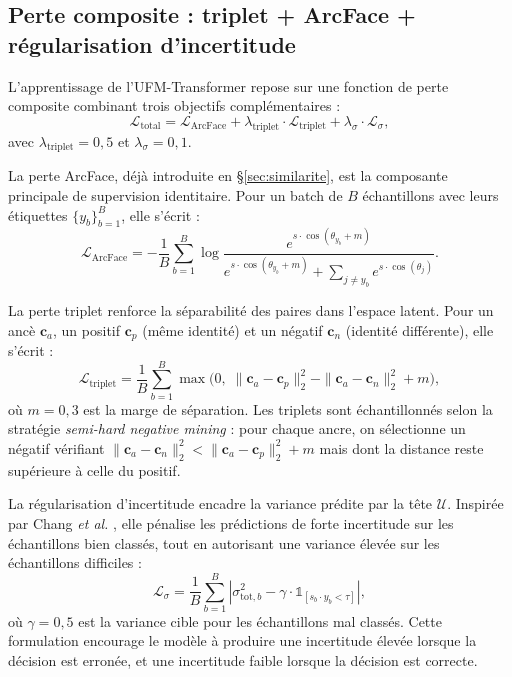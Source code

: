 \documentclass[12pt,a4paper]{report}
\newcommand{\margin}{\ensuremath{m}}
\begin{document}
\subsection{Perte composite : triplet + ArcFace + r\'{e}gularisation d'incertitude}

L'apprentissage de l'UFM-Transformer repose sur une fonction de perte composite combinant trois objectifs compl\'{e}mentaires :
\begin{equation}
\label{eq:perte-totale}
\mathcal{L}_{\text{total}} = \mathcal{L}_{\text{ArcFace}} + \lambda_{\text{triplet}} \cdot \mathcal{L}_{\text{triplet}} + \lambda_{\sigma} \cdot \mathcal{L}_{\sigma},
\end{equation}
avec $\lambda_{\text{triplet}} = 0{,}5$ et $\lambda_{\sigma} = 0{,}1$.

La perte ArcFace, d\'{e}j\`{a} introduite en \S\ref{sec:similarite}, est la composante principale de supervision identitaire. Pour un batch de $B$ \'{e}chantillons avec leurs \'{e}tiquettes $\{y_b\}_{b=1}^B$, elle s'\'{e}crit :
\begin{equation}
\mathcal{L}_{\text{ArcFace}} = -\frac{1}{B} \sum_{b=1}^B \log \frac{e^{s \cdot \cos(\theta_{y_b} + m)}}{e^{s \cdot \cos(\theta_{y_b} + m)} + \sum_{j \neq y_b} e^{s \cdot \cos(\theta_j)}}.
\end{equation}

La perte triplet renforce la s\'{e}parabilit\'{e} des paires dans l'espace latent. Pour un anc\`{e} $\mathbf{c}_a$, un positif $\mathbf{c}_p$ (m\^{e}me identit\'{e}) et un n\'{e}gatif $\mathbf{c}_n$ (identit\'{e} diff\'{e}rente), elle s'\'{e}crit :
\begin{equation}
\label{eq:perte-triplet}
\mathcal{L}_{\text{triplet}} = \frac{1}{B} \sum_{b=1}^B \max\bigl(0, \; \|\mathbf{c}_a - \mathbf{c}_p\|_2^2 - \|\mathbf{c}_a - \mathbf{c}_n\|_2^2 + \margin\bigr),
\end{equation}
o\`{u} $\margin = 0{,}3$ est la marge de s\'{e}paration. Les triplets sont \'{e}chantillonn\'{e}s selon la strat\'{e}gie \emph{semi-hard negative mining} : pour chaque ancre, on s\'{e}lectionne un n\'{e}gatif v\'{e}rifiant $\|\mathbf{c}_a - \mathbf{c}_n\|_2^2 < \|\mathbf{c}_a - \mathbf{c}_p\|_2^2 + \margin$ mais dont la distance reste sup\'{e}rieure \`{a} celle du positif.

La r\'{e}gularisation d'incertitude encadre la variance pr\'{e}dite par la t\^{e}te $\mathcal{U}$. Inspir\'{e}e par Chang \textit{et al.} \cite{chang2020data}, elle p\'{e}nalise les pr\'{e}dictions de forte incertitude sur les \'{e}chantillons bien class\'{e}s, tout en autorisant une variance \'{e}lev\'{e}e sur les \'{e}chantillons difficiles :
\begin{equation}
\label{eq:perte-sigma}
\mathcal{L}_{\sigma} = \frac{1}{B} \sum_{b=1}^B \left| \sigma^2_{\text{tot},b} - \gamma \cdot \mathbb{1}_{[s_b \cdot y_b < \tau]} \right|,
\end{equation}
o\`{u} $\gamma = 0{,}5$ est la variance cible pour les \'{e}chantillons mal class\'{e}s. Cette formulation encourage le mod\`{e}le \`{a} produire une incertitude \'{e}lev\'{e}e lorsque la d\'{e}cision est erron\'{e}e, et une incertitude faible lorsque la d\'{e}cision est correcte.
\end{document}
